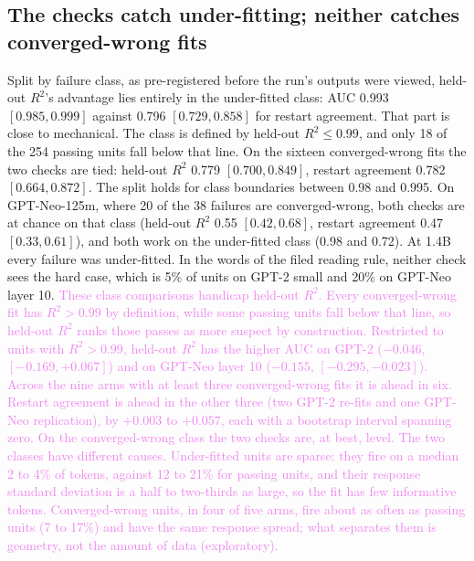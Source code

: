 \documentclass[10pt]{article}
\newcommand{\draft}[1]{\textcolor{violet}{#1}}
\begin{document}
\subsection{The checks catch under-fitting; neither catches converged-wrong fits}
\label{sec:classes}
Split by failure class, as pre-registered before the run's outputs were viewed, held-out
$R^2$'s advantage lies entirely in the under-fitted class: AUC 0.993 $[0.985, 0.999]$ against
0.796 $[0.729, 0.858]$ for restart agreement. That part is close to mechanical. The class is
defined by held-out $R^2 \le 0.99$, and only 18 of the 254 passing units fall below that line.
On the sixteen converged-wrong fits the two checks are tied: held-out $R^2$ 0.779
$[0.700, 0.849]$, restart agreement 0.782 $[0.664, 0.872]$. The split holds for class boundaries
between 0.98 and 0.995. On GPT-Neo-125m, where 20 of the 38 failures are converged-wrong, both
checks are at chance on that class (held-out $R^2$ 0.55 $[0.42, 0.68]$, restart agreement 0.47
$[0.33, 0.61]$), and both work on the under-fitted class (0.98 and 0.72). At 1.4B every failure
was under-fitted. In the words of the filed reading rule, neither check sees the hard case,
which is 5\% of units on GPT-2 small and 20\% on GPT-Neo layer 10. \draft{These class
comparisons handicap held-out $R^2$. Every converged-wrong fit has $R^2 > 0.99$ by definition,
while some passing units fall below that line, so held-out $R^2$ ranks those passes as more
suspect by construction. Restricted to units with $R^2 > 0.99$, held-out $R^2$ has the higher AUC
on GPT-2 ($-0.046$, $[-0.169, +0.067]$) and on GPT-Neo layer 10 ($-0.155$, $[-0.295, -0.023]$).
Across the nine arms with at least three converged-wrong fits it is ahead in six. Restart
agreement is ahead in the other three (two GPT-2 re-fits and one GPT-Neo replication), by
$+0.003$ to $+0.057$, each with a bootstrap interval spanning zero. On the converged-wrong class
the two checks are, at best, level.}
\draft{The two classes have different causes. Under-fitted units are sparse: they fire on a
median 2 to 4\% of tokens, against 12 to 21\% for passing units, and their response standard
deviation is a half to two-thirds as large, so the fit has few informative tokens.
Converged-wrong units, in four of five arms, fire about as often as passing units (7 to 17\%)
and have the same response spread; what separates them is geometry, not the amount of data
(exploratory).}
\end{document}
